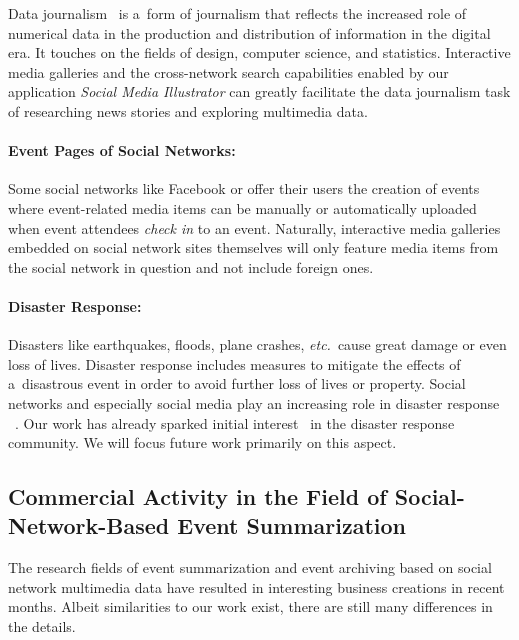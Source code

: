 Data journalism~\cite{rogers2011datajournalism,gray2012data}
is a~form of journalism that reflects the increased role
of numerical data in the production and distribution of information
in the digital era.
It touches on the fields of design, computer science, and statistics.
Interactive media galleries and the cross-network search capabilities enabled by our application \emph{Social Media Illustrator}
can greatly facilitate the data journalism task of researching news stories and exploring multimedia data.

\paragraph{Event Pages of Social Networks:}

Some social networks like Facebook or \googleplus
offer their users the creation of events where
event-related media items can be manually or automatically
uploaded when event attendees \emph{check in} to an event.
Naturally, interactive media galleries embedded on
social network sites themselves will only feature media items
from the social network in question and not include foreign ones.

\paragraph{Disaster Response:}

Disasters like earthquakes, floods, plane crashes, \emph{etc.}\ cause
great damage or even loss of lives.
Disaster response includes measures to
mitigate the effects of a~disastrous event
in order to avoid further loss of lives or property.
Social networks and especially social media
play an increasing role in disaster response%
~\cite{shklovski2008disasterresponse,sutton2008backchannels}.
Our work has already sparked initial interest~\cite{meier2013wikipedia}
in the disaster response community.
We will focus future work primarily on this aspect.

\subsection{Commercial Activity in the Field of Social-Network-Based Event Summarization}

The research fields of event summarization and event archiving
based on social network multimedia data have resulted in 
interesting business creations in recent months.
Albeit similarities to our work exist,
there are still many differences in the details.

